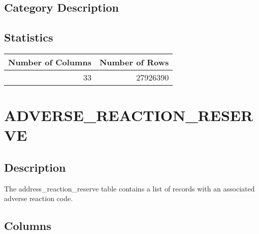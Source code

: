 \documentclass[
  letterpaper,
  DIV=11,
  numbers=noendperiod]{scrreprt}
\begin{document}
\hypertarget{category-description}{%
\section*{Category Description}\label{category-description}}

\hypertarget{statistics}{%
\section*{Statistics}\label{statistics}}

\begin{longtable}{rr}
\toprule
Number of Columns & Number of Rows \\ 
\midrule
33 & 27926390 \\ 
\bottomrule
\end{longtable}

\hypertarget{adverse_reaction_reserve}{%
\chapter*{ADVERSE\_REACTION\_RESERVE}\label{adverse_reaction_reserve}}

\hypertarget{description-1}{%
\section*{Description}\label{description-1}}

The address\_reaction\_reserve table contains a list of records with an
associated adverse reaction code.

\hypertarget{columns-1}{%
\section*{Columns}\label{columns-1}}
\end{document}

